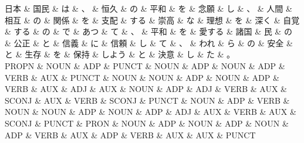 \documentclass[tikz,border=5pt]{standalone}
\begin{document}
\small
\begin{dependency}[edge unit distance=4.7pt]
    \begin{deptext}[column sep=0.5em]
        日本 \& 国民 \& は \& 、 \& 恒久 \& の \& 平和 \& を \& 念願 \& し \& 、 \& 人間 \& 相互 \& の \& 関係 \& を \& 支配 \& する \& 崇高 \& な \& 理想 \& を \& 深く \& 自覚 \& する \& の \& で \& あつ \& て \& 、 \& 平和 \& を \& 愛する \& 諸国 \& 民 \& の \& 公正 \& と \& 信義 \& に \& 信頼 \& し \& て \& 、 \& われ \& ら \& の \& 安全 \& と \& 生存 \& を \& 保持 \& しよう \& と \& 決意 \& し \& た \& 。\\
        PROPN \& NOUN \& ADP \& PUNCT \& NOUN \& ADP \& NOUN \& ADP \& VERB \& AUX \& PUNCT \& NOUN \& NOUN \& ADP \& NOUN \& ADP \& VERB \& AUX \& ADJ \& AUX \& NOUN \& ADP \& ADJ \& VERB \& AUX \& SCONJ \& AUX \& VERB \& SCONJ \& PUNCT \& NOUN \& ADP \& VERB \& NOUN \& NOUN \& ADP \& NOUN \& ADP \& ADJ \& AUX \& VERB \& AUX \& SCONJ \& PUNCT \& PRON \& NOUN \& ADP \& NOUN \& ADP \& NOUN \& ADP \& VERB \& AUX \& ADP \& VERB \& AUX \& AUX \& PUNCT\\
    \end{deptext}
\end{dependency}
\end{document}

